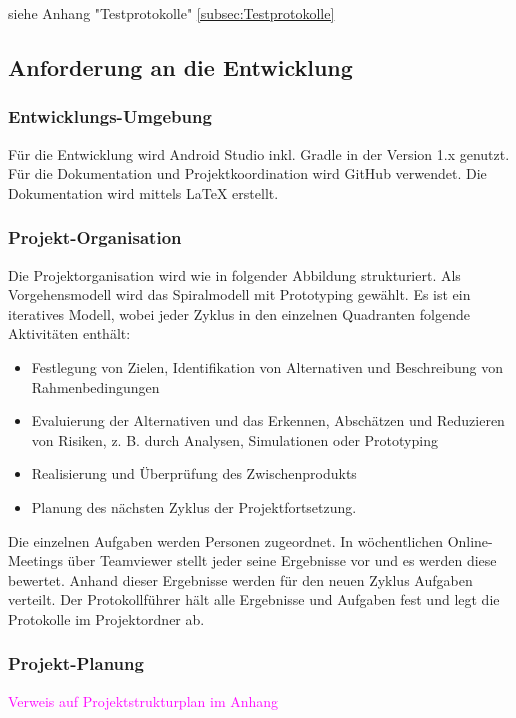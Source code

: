 siehe Anhang "Testprotokolle" \ref{subsec:Testprotokolle}



\subsection{\textbf{Anforderung an die Entwicklung}}

\subsubsection{Entwicklungs-Umgebung}
Für die Entwicklung wird Android Studio inkl. Gradle in der Version 1.x genutzt. Für die Dokumentation und Projektkoordination wird GitHub verwendet.
Die Dokumentation wird mittels \LaTeX{} erstellt.



\subsubsection{Projekt-Organisation}
Die Projektorganisation wird wie in folgender Abbildung strukturiert. Als Vorgehensmodell wird das Spiralmodell mit Prototyping gewählt. Es ist ein iteratives Modell, wobei jeder Zyklus in den einzelnen Quadranten folgende Aktivitäten enthält:

\begin{itemize}
	\item Festlegung von Zielen, Identifikation von Alternativen und Beschreibung von Rahmenbedingungen
	\item Evaluierung der Alternativen und das Erkennen, Abschätzen und Reduzieren von Risiken, z. B. durch Analysen, Simulationen oder Prototyping
	\item Realisierung und Überprüfung des Zwischenprodukts
	\item Planung des nächsten Zyklus der Projektfortsetzung.
\end{itemize}

Die einzelnen Aufgaben werden Personen zugeordnet. In wöchentlichen Online-Meetings über Teamviewer stellt jeder seine Ergebnisse vor und es werden diese bewertet. Anhand dieser Ergebnisse werden für den neuen Zyklus Aufgaben verteilt. Der Protokollführer hält alle Ergebnisse und Aufgaben fest und legt die Protokolle im Projektordner ab.




\subsubsection{Projekt-Planung}
\textcolor{magenta}{Verweis auf Projektstrukturplan im Anhang}

